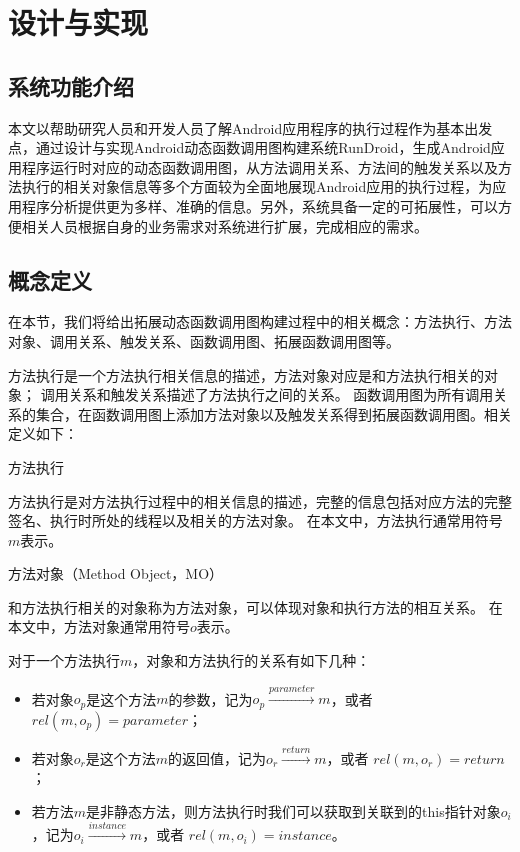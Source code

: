 \chapter{设计与实现 }
\label{ch3}

\section{系统功能介绍}
本文以帮助研究人员和开发人员了解Android应用程序的执行过程作为基本出发点，通过设计与实现Android动态函数调用图构建系统RunDroid，生成Android应用程序运行时对应的动态函数调用图，从方法调用关系、方法间的触发关系以及方法执行的相关对象信息等多个方面较为全面地展现Android应用的执行过程，为应用程序分析提供更为多样、准确的信息。另外，系统具备一定的可拓展性，可以方便相关人员根据自身的业务需求对系统进行扩展，完成相应的需求。

\section{概念定义}

在本节，我们将给出拓展动态函数调用图构建过程中的相关概念：方法执行、方法对象、调用关系、触发关系、函数调用图、拓展函数调用图等。

方法执行是一个方法执行相关信息的描述，方法对象对应是和方法执行相关的对象；
调用关系和触发关系描述了方法执行之间的关系。
函数调用图为所有调用关系的集合，在函数调用图上添加方法对象以及触发关系得到拓展函数调用图。相关定义如下：

\begin{myDef}方法执行\end{myDef}
	
	
	方法执行是对方法执行过程中的相关信息的描述，完整的信息包括对应方法的完整签名、执行时所处的线程以及相关的方法对象。
	在本文中，方法执行通常用符号$m$表示。


\begin{myDef}
	方法对象（Method Object，MO）
\end{myDef}
	和方法执行相关的对象称为方法对象，可以体现对象和执行方法的相互关系。
	在本文中，方法对象通常用符号$o$表示。
	
	
	对于一个方法执行$m$，对象和方法执行的关系有如下几种：
	\begin{itemize}
		\item 若对象$o_p$是这个方法$m$的参数，记为$o_p \stackrel{parameter}{\longrightarrow} m$，或者 $ rel(m,o_p) = parameter$；
		\item 若对象$o_r$是这个方法$m$的返回值，记为$o_r \stackrel{return}{\longrightarrow} m$，或者 $ rel(m,o_r) = return$；
		\item 若方法$m$是非静态方法，则方法执行时我们可以获取到关联到的this指针对象$o_i$，记为$o_i \stackrel{instance}{\longrightarrow} m$，或者 $ rel(m,o_i) = instance$。
	\end{itemize}


